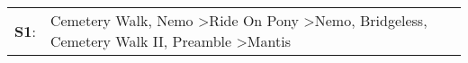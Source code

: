 \begin{supertabular}{p{0.03\textwidth}p{0.92\textwidth}}
 \textbf{S1}:  &  Cemetery Walk\textsuperscript{}, \enspace Nemo\textsuperscript{} \textgreater \enspace Ride On Pony\textsuperscript{} \textgreater \enspace Nemo\textsuperscript{}, \enspace Bridgeless\textsuperscript{}, \enspace Cemetery Walk II\textsuperscript{}, \enspace Preamble\textsuperscript{} \textgreater \enspace Mantis\textsuperscript{}  \enspace  \\
\end{supertabular}
